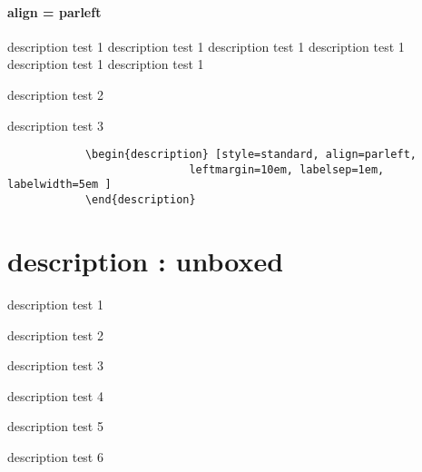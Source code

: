 \documentclass[12pt, a4paper, oneside]{book}
\let\stdsection\section
\renewcommand\section{\newpage\stdsection}
\begin{document}
			\paragraph{ align = parleft }
			\begin{description}	[
							style=standard, 
							align=parleft,
							leftmargin=10em,
							labelsep=1em,
							labelwidth=5em
							]
			\item	[description1]		description test 1 description test 1 description test 1 description test 1 description test 1 description test 1
			\item	[description]		description test 2
			\item	[descrip]			description test 3
			\end{description}

		\begin{mdframed}[style=code_document, frametitle={code}]
			\begin{verbatim}
			\begin{description}	[style=standard, align=parleft,
							leftmargin=10em, labelsep=1em, labelwidth=5em ]
			\end{description}
			\end{verbatim}
		\end{mdframed}


	\section{description : unboxed}
			\begin{description}[style=unboxed]
			\setlength\topsep{0.0em}
			\setlength\itemsep{-1.0em}
			\setlength\leftmargin{12cm}
			\setlength{}
			\setlength{}


			\item	[description 1]	description test 1
			\item	[description]		description test 2
			\item	[descrip]			description test 3
			\item	[descrip]			description test 4
			\item	[desc]			description test 5
			\item	[d]				description test 6
			\end{description}
\end{document}
